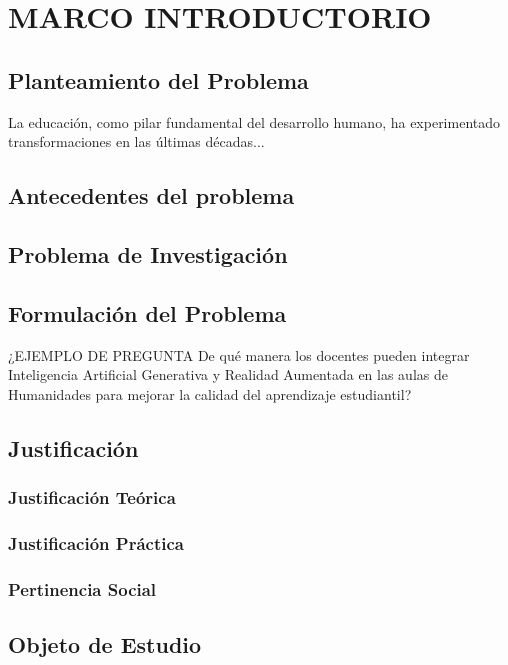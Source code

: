 \documentclass[12pt,oneside,letterpaper]{book}
\begin{document}
\chapter{MARCO INTRODUCTORIO}
\thispagestyle{fancy}

\section{Planteamiento del Problema}
La educación, como pilar fundamental del desarrollo humano, ha experimentado transformaciones en las últimas décadas...

\section{Antecedentes del problema}
\lipsum[1]

\section{Problema de Investigación}
\lipsum[1]

\section{Formulación del Problema}
¿EJEMPLO DE PREGUNTA De qué manera los docentes pueden integrar Inteligencia Artificial Generativa y Realidad Aumentada en las aulas de Humanidades para mejorar la calidad del aprendizaje estudiantil?

\section{Justificación}
\lipsum[1]

\subsection{Justificación Teórica}
\lipsum[1]

\subsection{Justificación Práctica}
\lipsum[1]

\subsection{Pertinencia Social}
\lipsum[1]

\section{Objeto de Estudio}
\lipsum[1]
\end{document}
